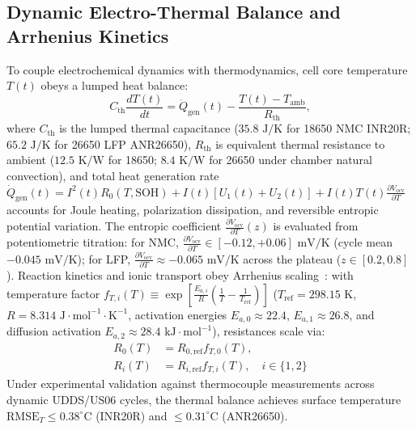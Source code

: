 \documentclass[balance,nocopyright,upint,varvw,hyphenate,barcolor=NavyBlue,nolists]{asmejour}
\begin{document}
\subsection{Dynamic Electro-Thermal Balance and Arrhenius Kinetics}
To couple electrochemical dynamics with thermodynamics, cell core temperature $T(t)$ obeys a lumped heat balance:
\begin{equation}\label{eqn:thermal_balance}
C_{\text{th}} \frac{d T(t)}{dt} = \dot{Q}_{\text{gen}}(t) - \frac{T(t) - T_{\text{amb}}}{R_{\text{th}}},
\end{equation}
where $C_{\text{th}}$ is the lumped thermal capacitance ($35.8\text{ J/K}$ for 18650 NMC INR20R; $65.2\text{ J/K}$ for 26650 LFP ANR26650), $R_{\text{th}}$ is equivalent thermal resistance to ambient ($12.5\text{ K/W}$ for 18650; $8.4\text{ K/W}$ for 26650 under chamber natural convection), and total heat generation rate $\dot{Q}_{\text{gen}}(t) = I^2(t) R_0(T, \text{SOH}) + I(t)[U_1(t) + U_2(t)] + I(t) T(t) \frac{\partial V_{\text{ocv}}}{\partial T}$ accounts for Joule heating, polarization dissipation, and reversible entropic potential variation. The entropic coefficient $\frac{\partial V_{\text{ocv}}}{\partial T}(z)$ is evaluated from potentiometric titration: for NMC, $\frac{\partial V_{\text{ocv}}}{\partial T} \in [-0.12, +0.06]\text{ mV/K}$ (cycle mean $-0.045\text{ mV/K}$); for LFP, $\frac{\partial V_{\text{ocv}}}{\partial T} \approx -0.065\text{ mV/K}$ across the plateau ($z \in [0.2, 0.8]$). Reaction kinetics and ionic transport obey Arrhenius scaling~\cite{He2011ecm,Ren2019aging}: with temperature factor $f_{T,i}(T) \equiv \exp[\frac{E_{a,i}}{R}(\frac{1}{T} - \frac{1}{T_{\text{ref}}})]$ ($T_{\text{ref}} = 298.15\text{ K}$, $R = 8.314\text{ J}\cdot\text{mol}^{-1}\cdot\text{K}^{-1}$, activation energies $E_{a,0} \approx 22.4$, $E_{a,1} \approx 26.8$, and diffusion activation $E_{a,2} \approx 28.4\text{ kJ}\cdot\text{mol}^{-1}$), resistances scale via:
\begin{align}
R_0(T) &= R_{0,\text{ref}} f_{T,0}(T), \label{eqn:arrh_r0}\\
R_i(T) &= R_{i,\text{ref}} f_{T,i}(T), \quad i \in \{1, 2\} \label{eqn:arrh_ri}
\end{align}
Under experimental validation against thermocouple measurements across dynamic UDDS/US06 cycles, the thermal balance achieves surface temperature $\text{RMSE}_T \le 0.38^\circ\text{C}$ (INR20R) and $\le 0.31^\circ\text{C}$ (ANR26650).
\end{document}
